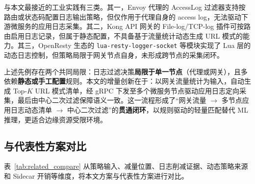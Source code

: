 与本文最接近的工业实践有三类。其一，Envoy 代理的 AccessLog 过滤器支持按路由或状态码配置日志输出策略，但仅作用于代理自身的 access log，无法驱动下游微服务的应用日志采集。其二，Kong API 网关的 File-log/TCP-log 插件可按路由启用日志记录，但属于静态配置，不具备基于流量统计动态生成 URL 模式的能力。其三，OpenResty 生态的 \texttt{lua-resty-logger-socket} 等模块实现了 Lua 层的动态日志控制，但策略局限于网关节点自身，未形成跨节点的采集闭环。

上述先例存在两个共同局限：日志过滤决策\textbf{局限于单一节点}（代理或网关），且多依赖\textbf{静态或手工配置}规则。本文的增量创新在于：以网关流量统计为输入，自动生成 Top-$K$ URL 模式清单，经 gRPC 下发至多个微服务节点驱动应用日志定向采集，最后由中心二次过滤保障语义一致。这一流程形成了``网关流量 $\rightarrow$ 多节点应用日志动态清单 $\rightarrow$ 中心二次过滤''的\textbf{贯通闭环}，以规则驱动的轻量匹配替代 ML 推理，更适合边缘资源受限环境。

\subsection{与代表性方案对比}
表~\ref{tab:related_compare} 从策略输入、减量位置、日志削减证据、动态策略来源和 Sidecar 开销等维度，将本文方案与代表性方案进行对比。

\begin{table}[htbp]
  \centering
  \small
  \caption{与代表性日志采集/可观测性方案对比}\label{tab:related_compare}
\end{table}

